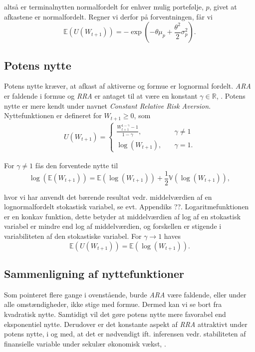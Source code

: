 \documentclass[
  a4paper,
  oneside]{memoir}
\begin{document}
altså er terminalnytten normalfordelt for enhver mulig portefølje, \(p\), givet at afkastene er normalfordelt. Regner vi derfor på forventningen, får vi
\[\mathbb{E}(U(W_{t+1}))=-\exp\left(-\theta\mu_p+\frac{\theta^2}{2}\sigma_p^2\right).\]

\hypertarget{potens-nytte}{%
\subsection{Potens nytte}\label{potens-nytte}}

Potens nytte kræver, at afkast af aktiverne og formue er lognormal fordelt. \emph{ARA} er faldende i formue og \emph{RRA} er antaget til at være en konstant \(\gamma\in\mathbb{R}\), \citep{CampVic2003}. Potens nytte er mere kendt under navnet \emph{Constant Relative Risk Aversion}. Nyttefunktionen er defineret for \(W_{t+1}\geq 0\), som
\begin{align}
U(W_{t+1})=\begin{cases} \frac{W_{t+1}^{1-\gamma}-1}{1-\gamma},\quad &\gamma\neq 1\\
\log(W_{t+1}),\quad &\gamma = 1. \end{cases} \label{eq:Potnytte}
\end{align}

For \(\gamma\neq 1\) fås den forventede nytte til
\[\log(\mathbb{E}(W_{t+1}))=\mathbb{E}(\log(W_{t+1}))+\frac{1}{2}\mathbb{V}(\log(W_{t+1})),\]

hvor vi har anvendt det bærende resultat vedr. middelværdien af en lognormalfordelt stokastisk variabel, se evt. Appendiks ??. Logaritmefunktionen er en konkav funktion, dette betyder at middelværdien af log af en stokastisk variabel er mindre end log af middelværdien, og forskellen er stigende i variabiliteten af den stokastiske variabel. For \(\gamma \rightarrow 1\) haves
\[\mathbb{E}(U(W_{t+1}))=\mathbb{E}(\log(W_{t+1})).\]

\hypertarget{sammenligning-af-nyttefunktioner}{%
\subsection{Sammenligning af nyttefunktioner}\label{sammenligning-af-nyttefunktioner}}

Som pointeret flere gange i ovenstående, burde \emph{ARA} være faldende, eller under alle omstændigheder, ikke stige med formue. Dermed kan vi se bort fra kvadratisk nytte. Samtidigt vil det gøre potens nytte mere favorabel end eksponentiel nytte. Derudover er det konstante aspekt af \emph{RRA} attraktivt under potens nytte, i og med, at det er nødvendigt ift. inferensen vedr. stabiliteten af finansielle variable under sekulær økonomisk vækst, \citep{CampVic2003}.
\end{document}
